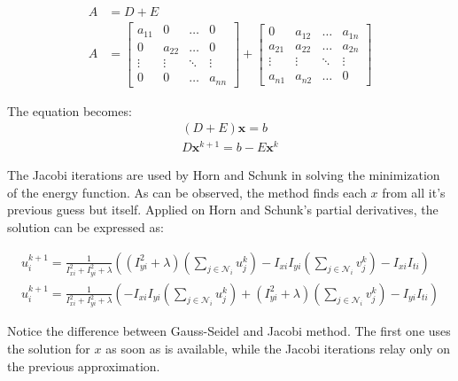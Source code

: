 \documentclass[12pt,a4paper,twoside]{report}
\begin{document}
{\begin{equation}
	\begin{split}
	A &= D + E \\
	A &= 
		\begin{bmatrix}
			a_{11} &  0  & \ldots & 0\\
				0	 &  a_{22} & \ldots & 0\\
			\vdots & \vdots & \ddots & \vdots\\
			0   &  0      &\ldots & a_{nn}
		\end{bmatrix}
		+
		\begin{bmatrix}
			0 &  a_{12}  & \ldots & a_{1n}\\
			a_{21} &  a_{22} & \ldots & a_{2n}\\
			\vdots & \vdots & \ddots & \vdots\\
			a_{n1} &  a_{n2}       &\ldots & 0
		\end{bmatrix}
	\end{split}
\end{equation}

The equation becomes:
\begin{equation}
\begin{split}
(D+E)\boldsymbol{x} = b\\
D\boldsymbol{x}^{k+1} = b - E\boldsymbol{x}^{k}
\end{split}
\end{equation}

The Jacobi iterations are used by Horn and Schunk in solving the minimization of the energy function. As can be observed, the method finds each $x$ from all it's previous guess but itself. Applied on Horn and Schunk's partial derivatives, the solution can be expressed as:

\begin{equation} \label{JEq}
\begin{split}
u^{k+1}_i = \frac{1}{I_{xi}^2+I_{yi}^2+ \lambda}
\left(
(I_{yi}^2+\lambda)(\sum_{j \in \mathcal{N}_i} u_j^{k})
-I_{xi}I_{yi}(\sum_{j \in \mathcal{N}_i} v_j^{k})
-I_{xi}I_{ti}
\right)
\\
u^{k+1}_i = \frac{1}{I_{xi}^2+I_{yi}^2+ \lambda}
\left(
-I_{xi}I_{yi}(\sum_{j \in \mathcal{N}_i} u_j^{k})
+(I_{yi}^2+\lambda)(\sum_{j \in \mathcal{N}_i} v_j^{k})
-I_{yi}I_{ti}
\right)
\end{split}
\end{equation}

Notice the difference between Gauss-Seidel and Jacobi method. The first one uses the solution for $x$ as soon as is available, while the Jacobi iterations relay only on the previous approximation.


}
\end{document}
